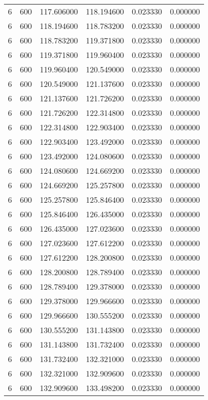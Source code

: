 \begin{longtable}{rrrrrr}
6 & 600 & 117.606000 & 118.194600 & 0.023330 & 0.000000 \\
6 & 600 & 118.194600 & 118.783200 & 0.023330 & 0.000000 \\
6 & 600 & 118.783200 & 119.371800 & 0.023330 & 0.000000 \\
6 & 600 & 119.371800 & 119.960400 & 0.023330 & 0.000000 \\
6 & 600 & 119.960400 & 120.549000 & 0.023330 & 0.000000 \\
6 & 600 & 120.549000 & 121.137600 & 0.023330 & 0.000000 \\
6 & 600 & 121.137600 & 121.726200 & 0.023330 & 0.000000 \\
6 & 600 & 121.726200 & 122.314800 & 0.023330 & 0.000000 \\
6 & 600 & 122.314800 & 122.903400 & 0.023330 & 0.000000 \\
6 & 600 & 122.903400 & 123.492000 & 0.023330 & 0.000000 \\
6 & 600 & 123.492000 & 124.080600 & 0.023330 & 0.000000 \\
6 & 600 & 124.080600 & 124.669200 & 0.023330 & 0.000000 \\
6 & 600 & 124.669200 & 125.257800 & 0.023330 & 0.000000 \\
6 & 600 & 125.257800 & 125.846400 & 0.023330 & 0.000000 \\
6 & 600 & 125.846400 & 126.435000 & 0.023330 & 0.000000 \\
6 & 600 & 126.435000 & 127.023600 & 0.023330 & 0.000000 \\
6 & 600 & 127.023600 & 127.612200 & 0.023330 & 0.000000 \\
6 & 600 & 127.612200 & 128.200800 & 0.023330 & 0.000000 \\
6 & 600 & 128.200800 & 128.789400 & 0.023330 & 0.000000 \\
6 & 600 & 128.789400 & 129.378000 & 0.023330 & 0.000000 \\
6 & 600 & 129.378000 & 129.966600 & 0.023330 & 0.000000 \\
6 & 600 & 129.966600 & 130.555200 & 0.023330 & 0.000000 \\
6 & 600 & 130.555200 & 131.143800 & 0.023330 & 0.000000 \\
6 & 600 & 131.143800 & 131.732400 & 0.023330 & 0.000000 \\
6 & 600 & 131.732400 & 132.321000 & 0.023330 & 0.000000 \\
6 & 600 & 132.321000 & 132.909600 & 0.023330 & 0.000000 \\
6 & 600 & 132.909600 & 133.498200 & 0.023330 & 0.000000 \\

\end{longtable}
